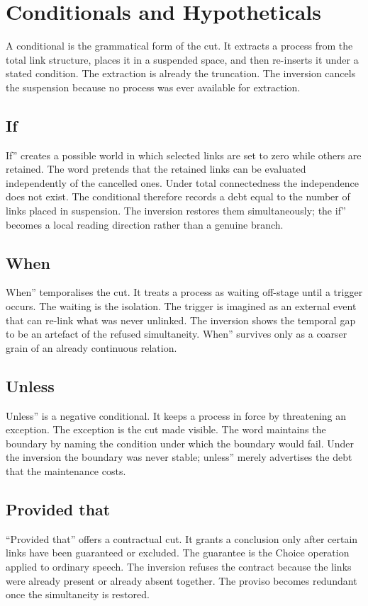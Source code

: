 \documentclass[11pt,a4paper]{article}
\begin{document}
\section{Conditionals and Hypotheticals}

A conditional is the grammatical form of the cut. It extracts a process from the total link structure, places it in a suspended space, and then re-inserts it under a stated condition. The extraction is already the truncation. The inversion cancels the suspension because no process was ever available for extraction.

\subsection{If} If'' creates a possible world in which selected links are set to zero while others are retained. The word pretends that the retained links can be evaluated independently of the cancelled ones. Under total connectedness the independence does not exist. The conditional therefore records a debt equal to the number of links placed in suspension. The inversion restores them simultaneously; the if'' becomes a local reading direction rather than a genuine branch.

\subsection{When} When'' temporalises the cut. It treats a process as waiting off-stage until a trigger occurs. The waiting is the isolation. The trigger is imagined as an external event that can re-link what was never unlinked. The inversion shows the temporal gap to be an artefact of the refused simultaneity. When'' survives only as a coarser grain of an already continuous relation.

\subsection{Unless} Unless'' is a negative conditional. It keeps a process in force by threatening an exception. The exception is the cut made visible. The word maintains the boundary by naming the condition under which the boundary would fail. Under the inversion the boundary was never stable; unless'' merely advertises the debt that the maintenance costs.

\subsection{Provided that} ``Provided that'' offers a contractual cut. It grants a conclusion only after certain links have been guaranteed or excluded. The guarantee is the Choice operation applied to ordinary speech. The inversion refuses the contract because the links were already present or already absent together. The proviso becomes redundant once the simultaneity is restored.
\end{document}
